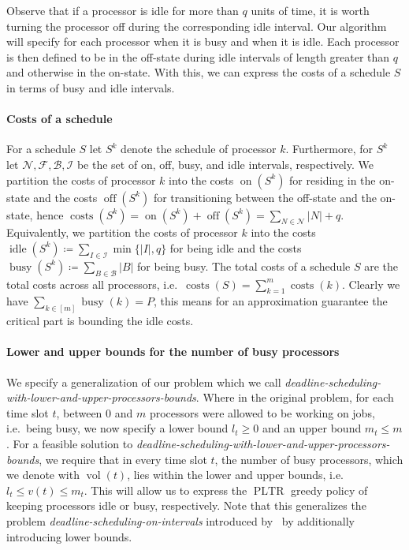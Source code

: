 \documentclass[a4paper]{article}
\DeclareMathOperator{\on}{on}
\DeclareMathOperator{\off}{off}
\DeclareMathOperator{\idle}{idle}
\DeclareMathOperator{\busy}{busy}
\DeclareMathOperator{\costs}{costs}
\DeclareMathOperator{\PLTR}{PLTR}
\DeclareMathOperator{\vol}{vol}
\begin{document}
Observe that if a processor is idle for more than $q$ units of time, it is worth turning the processor off during the corresponding idle interval.
Our algorithm will specify for each processor when it is busy and when it is idle.
Each processor is then defined to be in the off-state during idle intervals of length greater than $q$ and otherwise in the on-state.
With this, we can express the costs of a schedule $S$ in terms of busy and idle intervals.

\paragraph{Costs of a schedule}
For a schedule $S$ let $S^k$ denote the schedule of processor $k$.
Furthermore, for $S^k$ let $\mathcal{N}, \mathcal{F}, \mathcal{B}, \mathcal{I}$ be the set of on, off, busy, and idle intervals, respectively.
We partition the costs of processor $k$ into the costs $\on(S^k)$ for residing in the on-state and the costs $\off(S^k)$ for transitioning between the off-state and the on-state, hence $\costs(S^k) = \on(S^k) + \off(S^k) = \sum_{N \in \mathcal{N}} |N| + q$.
Equivalently, we partition the costs of processor $k$ into the costs $\idle(S^k) \coloneqq \sum_{I \in \mathcal{I}} \min \{ |I|, q \}$ for being idle and the costs $\busy(S^k) \coloneqq \sum_{B \in \mathcal{B}} |B|$ for being busy.
The total costs of a schedule $S$ are the total costs across all processors, i.e.\ $\costs(S) = \sum_{k = 1}^{m} \costs(k)$.
Clearly we have $\sum_{k \in [m]} \busy(k) = P$, this means for an approximation guarantee the critical part is bounding the idle costs.

\paragraph{Lower and upper bounds for the number of busy processors}
We specify a generalization of our problem which we call \emph{deadline-scheduling-with-lower-and-upper-processors-bounds}.
Where in the original problem, for each time slot $t$, between $0$ and $m$ processors were allowed to be working on jobs, i.e.\ being busy, we now specify a lower bound $l_t \geq 0$ and an upper bound $m_t \leq m$.
For a feasible solution to \emph{deadline-scheduling-with-lower-and-upper-processors-bounds}, we require that in every time slot $t$, the number of busy processors, which we denote with $\vol(t)$, lies within the lower and upper bounds, i.e.\ $l_t \leq v(t) \leq m_t$.
This will allow us to express the $\PLTR$ greedy policy of keeping processors idle or busy, respectively.
Note that this generalizes the problem \emph{deadline-scheduling-on-intervals} introduced by~\cite{antoniadis} by additionally introducing lower bounds.
\end{document}

